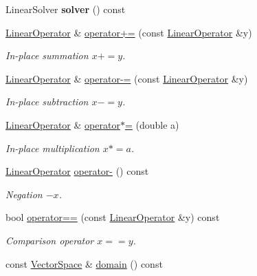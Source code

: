 \begin{DoxyCompactItemize}
\item 
\hypertarget{classSpacy_1_1dealII_1_1LinearOperator_a023d33af4a569bd87425b3110d2b4728}{\-Linear\-Solver {\bfseries solver} () const }\label{classSpacy_1_1dealII_1_1LinearOperator_a023d33af4a569bd87425b3110d2b4728}

\item 
\hyperlink{classSpacy_1_1dealII_1_1LinearOperator}{\-Linear\-Operator} \& \hyperlink{classSpacy_1_1dealII_1_1LinearOperator_a09a7e00eafec152845c49c16806c7fd9}{operator+=} (const \hyperlink{classSpacy_1_1dealII_1_1LinearOperator}{\-Linear\-Operator} \&y)
\begin{DoxyCompactList}\small\item\em \-In-\/place summation $ x+=y$. \end{DoxyCompactList}\item 
\hyperlink{classSpacy_1_1dealII_1_1LinearOperator}{\-Linear\-Operator} \& \hyperlink{classSpacy_1_1dealII_1_1LinearOperator_a8475b17943c631f2d126be04b973c34f}{operator-\/=} (const \hyperlink{classSpacy_1_1dealII_1_1LinearOperator}{\-Linear\-Operator} \&y)
\begin{DoxyCompactList}\small\item\em \-In-\/place subtraction $ x-=y$. \end{DoxyCompactList}\item 
\hyperlink{classSpacy_1_1dealII_1_1LinearOperator}{\-Linear\-Operator} \& \hyperlink{classSpacy_1_1dealII_1_1LinearOperator_a60f68f1061039046f334504305cbd365}{operator$\ast$=} (double a)
\begin{DoxyCompactList}\small\item\em \-In-\/place multiplication $ x*=a$. \end{DoxyCompactList}\item 
\hyperlink{classSpacy_1_1dealII_1_1LinearOperator}{\-Linear\-Operator} \hyperlink{classSpacy_1_1dealII_1_1LinearOperator_a533f6b270f5efd1190a3d43ac94f6e64}{operator-\/} () const 
\begin{DoxyCompactList}\small\item\em \-Negation $ -x$. \end{DoxyCompactList}\item 
bool \hyperlink{classSpacy_1_1dealII_1_1LinearOperator_ab431c22b0e0e0e2834f929793eb389a2}{operator==} (const \hyperlink{classSpacy_1_1dealII_1_1LinearOperator}{\-Linear\-Operator} \&y) const 
\begin{DoxyCompactList}\small\item\em \-Comparison operator $ x==y$. \end{DoxyCompactList}\item 
\hypertarget{classSpacy_1_1OperatorBase_a2588f9b3e0188820c4c494e63293dc6f}{const \hyperlink{classSpacy_1_1VectorSpace}{\-Vector\-Space} \& \hyperlink{classSpacy_1_1OperatorBase_a2588f9b3e0188820c4c494e63293dc6f}{domain} () const }\label{classSpacy_1_1OperatorBase_a2588f9b3e0188820c4c494e63293dc6f}


\end{DoxyCompactItemize}
